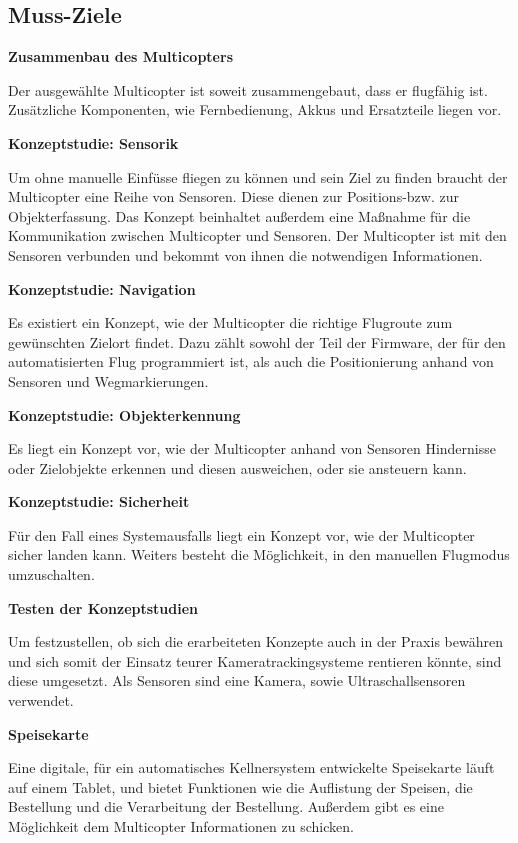   \subsection{Muss-Ziele}
  \textbf{Zusammenbau des Multicopters}

  Der ausgewählte Multicopter ist soweit zusammengebaut, dass er flugfähig ist.
  Zusätzliche Komponenten, wie Fernbedienung, Akkus und Ersatzteile liegen vor.

  \textbf{Konzeptstudie: Sensorik}

  Um ohne manuelle Einfüsse fliegen zu können und sein Ziel zu finden braucht der Multicopter eine Reihe
  von Sensoren. Diese dienen zur Positions-bzw. zur Objekterfassung. Das Konzept beinhaltet außerdem eine
  Maßnahme für die Kommunikation zwischen Multicopter und Sensoren.
  Der Multicopter ist mit den Sensoren verbunden und bekommt von ihnen die notwendigen Informationen.

  \textbf{Konzeptstudie: Navigation}

  Es existiert ein Konzept, wie der Multicopter die richtige Flugroute zum gewünschten
  Zielort findet. Dazu zählt sowohl der Teil der Firmware, der für den automatisierten Flug programmiert ist,
  als auch die Positionierung anhand von Sensoren und Wegmarkierungen.

  \textbf{Konzeptstudie: Objekterkennung}

  Es liegt ein Konzept vor, wie der Multicopter anhand von Sensoren Hindernisse oder Zielobjekte
  erkennen und diesen ausweichen, oder sie ansteuern kann.

  \textbf{Konzeptstudie: Sicherheit}

  Für den Fall eines Systemausfalls liegt ein Konzept vor, wie der Multicopter sicher landen kann.
  Weiters besteht die Möglichkeit, in den manuellen Flugmodus umzuschalten.

  \textbf{Testen der Konzeptstudien}

  Um festzustellen, ob sich die erarbeiteten Konzepte auch in der Praxis bewähren und sich somit der Einsatz teurer Kameratrackingsysteme rentieren könnte,
  sind diese umgesetzt. Als Sensoren sind eine Kamera, sowie Ultraschallsensoren verwendet.

  \textbf{Speisekarte}

  Eine digitale, für ein automatisches Kellnersystem entwickelte Speisekarte läuft auf einem Tablet,
  und bietet Funktionen wie die Auflistung der Speisen, die Bestellung und die Verarbeitung der Bestellung.
  Außerdem gibt es eine Möglichkeit dem Multicopter Informationen zu schicken.

